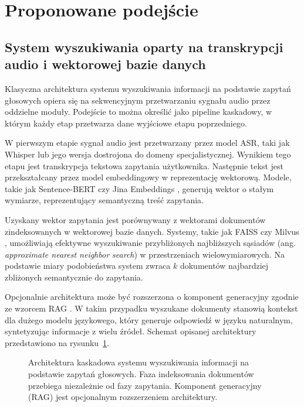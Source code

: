 \section{Proponowane podejście}

\subsection{System wyszukiwania oparty na transkrypcji audio i wektorowej bazie danych}
\label{sec:kaskada}

Klasyczna architektura systemu wyszukiwania informacji na podstawie zapytań głosowych opiera się na sekwencyjnym przetwarzaniu sygnału audio przez oddzielne moduły. Podejście to można określić jako pipeline kaskadowy, w którym każdy etap przetwarza dane wyjściowe etapu poprzedniego.

W pierwszym etapie sygnał audio jest przetwarzany przez model ASR, taki jak Whisper \cite{whisper} lub jego wersja dostrojona do domeny specjalistycznej. Wynikiem tego etapu jest transkrypcja tekstowa zapytania użytkownika. Następnie tekst jest przekształcany przez model embeddingowy w reprezentację wektorową. Modele, takie jak Sentence-BERT \cite{reimers2019sentence} czy Jina Embeddings \cite{gunther2023jina}, generują wektor o stałym wymiarze, reprezentujący semantyczną treść zapytania.

Uzyskany wektor zapytania jest porównywany z wektorami dokumentów zindeksowanych w wektorowej bazie danych. Systemy, takie jak FAISS \cite{johnson2019billion} czy Milvus \cite{wang2021milvus}, umożliwiają efektywne wyszukiwanie przybliżonych najbliższych sąsiadów (ang. \textit{approximate nearest neighbor search}) w przestrzeniach wielowymiarowych. Na podstawie miary podobieństwa system zwraca $k$ dokumentów najbardziej zbliżonych semantycznie do zapytania.

Opcjonalnie architektura może być rozszerzona o komponent generacyjny zgodnie ze wzorcem RAG \cite{lewis2020retrieval}. W takim przypadku wyszukane dokumenty stanowią kontekst dla dużego modelu językowego, który generuje odpowiedź w języku naturalnym, syntetyzując informacje z wielu źródeł. Schemat opisanej architektury przedstawiono na rysunku~\ref{fig:kaskadaArchitecture}.

\begin{figure}[htbp]
    \centering
    \caption{Architektura kaskadowa systemu wyszukiwania informacji na podstawie zapytań głosowych. Faza indeksowania dokumentów przebiega niezależnie od fazy zapytania. Komponent generacyjny (RAG) jest opcjonalnym rozszerzeniem architektury.}
    \label{fig:kaskadaArchitecture}
\end{figure}

